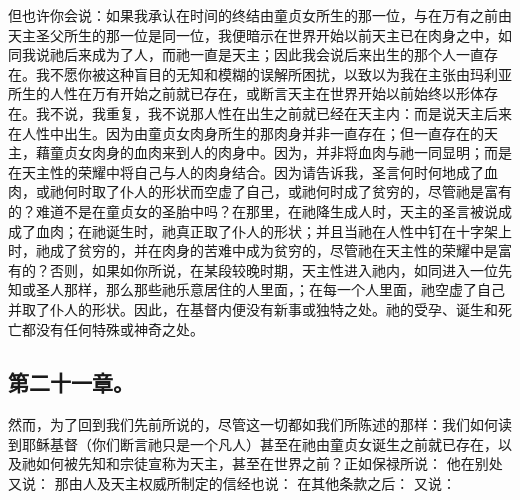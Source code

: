 但也许你会说：如果我承认在时间的终结由童贞女所生的那一位，与在万有之前由天主圣父所生的那一位是同一位，我便暗示在世界开始以前天主已在肉身之中，如同我说祂后来成为了人，而祂一直是天主；因此我会说后来出生的那个人一直存在。我不愿你被这种盲目的无知和模糊的误解所困扰，以致以为我在主张由玛利亚所生的人性在万有开始之前就已存在，或断言天主在世界开始以前始终以形体存在。我不说，我重复，我不说那人性在出生之前就已经在天主内：而是说天主后来在人性中出生。因为由童贞女肉身所生的那肉身并非一直存在；但一直存在的天主，藉童贞女肉身的血肉来到人的肉身中。因为，并非将血肉与祂一同显明；而是在天主性的荣耀中将自己与人的肉身结合。因为请告诉我，圣言何时何地成了血肉，或祂何时取了仆人的形状而空虚了自己，或祂何时成了贫穷的，尽管祂是富有的？难道不是在童贞女的圣胎中吗？在那里，在祂降生成人时，天主的圣言被说成成了血肉；在祂诞生时，祂真正取了仆人的形状；并且当祂在人性中钉在十字架上时，祂成了贫穷的，并在肉身的苦难中成为贫穷的，尽管祂在天主性的荣耀中是富有的？否则，如果如你所说，在某段较晚时期，天主性进入祂内，如同进入一位先知或圣人那样，那么那些祂乐意居住的人里面，；在每一个人里面，祂空虚了自己并取了仆人的形状。因此，在基督内便没有新事或独特之处。祂的受孕、诞生和死亡都没有任何特殊或神奇之处。\par


\subsection{第二十一章。}

\par

然而，为了回到我们先前所说的，尽管这一切都如我们所陈述的那样：我们如何读到耶稣基督（你们断言祂只是一个凡人）甚至在祂由童贞女诞生之前就已存在，以及祂如何被先知和宗徒宣称为天主，甚至在世界之前？正如保禄所说： 他在别处又说： 那由人及天主权威所制定的信经也说： 在其他条款之后： 又说：\par


